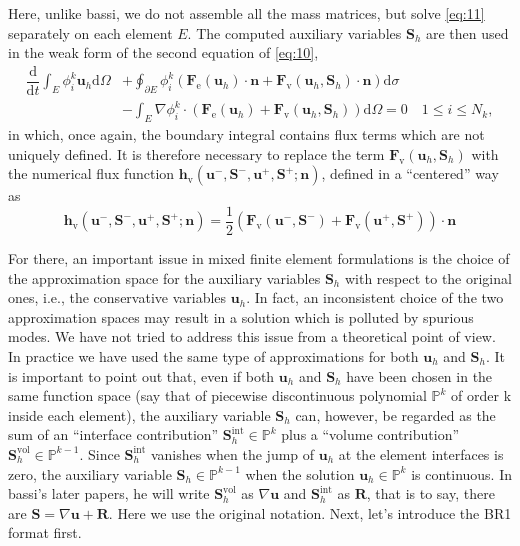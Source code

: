 \documentclass{develop-note}
\begin{document}
Here, unlike bassi, we do not assemble all the mass matrices, but solve \autoref{eq:11} separately on each element $E$. The computed auxiliary variables $\mathbf{S}_{h}$ are then used in the weak form of the second equation of \autoref{eq:10},
\begin{equation}
  \label{eq:13}
  \begin{aligned}
    \dfrac{\mathrm{d}}{\mathrm{d}t}\int_{E}\phi_{i}^{k}\mathbf{u}_{h}\mathrm{d}\Omega &+\oint_{\partial E}\phi_{i}^{k}(\mathbf{F}_{\mathrm{e}}(\mathbf{u}_{h})\cdot\mathbf{n}+\mathbf{F}_{\mathrm{v}}(\mathbf{u}_{h},\mathbf{S}_{h})\cdot\mathbf{n})\mathrm{d}\sigma\\
    &-\int_{E}\nabla\phi_{i}^{k}\cdot(\mathbf{F}_{\mathrm{e}}(\mathbf{u}_{h})+\mathbf{F}_{\mathrm{v}}(\mathbf{u}_{h},\mathbf{S}_{h}))\mathrm{d}\Omega=0\quad 1\leqslant i\leqslant N_{k},
  \end{aligned}
\end{equation}
in which, once again, the boundary integral contains flux terms which are not uniquely defined. It is therefore necessary to replace the term $\mathbf{F}_{\mathrm{v}}(\mathbf{u}_{h},\mathbf{S}_{h})$ with the numerical flux function $\mathbf{h}_{\mathrm{v}}(\mathbf{u}^{-},\mathbf{S}^{-},\mathbf{u}^{+},\mathbf{S}^{+};\mathbf{n})$, defined in a ``centered'' way as
\begin{equation}
  \mathbf{h}_{\mathrm{v}}(\mathbf{u}^{-},\mathbf{S}^{-},\mathbf{u}^{+},\mathbf{S}^{+};\mathbf{n})=\dfrac{1}{2}(\mathbf{F}_{\mathrm{v}}(\mathbf{u}^{-},\mathbf{S}^{-})+\mathbf{F}_{\mathrm{v}}(\mathbf{u}^{+},\mathbf{S}^{+}))\cdot\mathbf{n}
\end{equation}

For there, an important issue in mixed finite element formulations is the choice of the approximation space for the auxiliary variables $\mathbf{S}_{h}$ with respect to the original ones, i.e., the conservative variables $\mathbf{u}_{h}$. In fact, an inconsistent choice of the two approximation spaces may result in a solution which is polluted by spurious modes. We have not tried to address this issue from a theoretical point of view. In practice we have used the same type of approximations for both $\mathbf{u}_{h}$ and $\mathbf{S}_{h}$. It is important to point out that, even if both $\mathbf{u}_{h}$ and $\mathbf{S}_{h}$ have been chosen in the same function space (say that of piecewise discontinuous polynomial $\mathbb{P}^{k}$ of order k inside each element), the auxiliary variable $\mathbf{S}_{h}$ can, however, be regarded as the sum of an ``interface contribution'' $\mathbf{S}_{h}^{\mathrm{int}}\in\mathbb{P}^{k}$ plus a ``volume contribution'' $\mathbf{S}_{h}^{\mathrm{vol}}\in\mathbb{P}^{k-1}$. Since $\mathbf{S}_{h}^{\mathrm{int}}$ vanishes when the jump of $\mathbf{u}_{h}$ at the element interfaces is zero, the auxiliary variable $\mathbf{S}_{h}\in\mathbb{P}^{k-1}$ when the solution $\mathbf{u}_{h}\in\mathbb{P}^{k}$ is continuous. In bassi's later papers, he will write $\mathbf{S}_{h}^{\mathrm{vol}}$ as $\nabla\mathbf{u}$ and $\mathbf{S}_{h}^{\mathrm{int}}$ as $\mathbf{R}$, that is to say, there are $\mathbf{S}=\nabla\mathbf{u}+\mathbf{R}$. Here we use the original notation. Next, let's introduce the BR1 format first.
\end{document}
